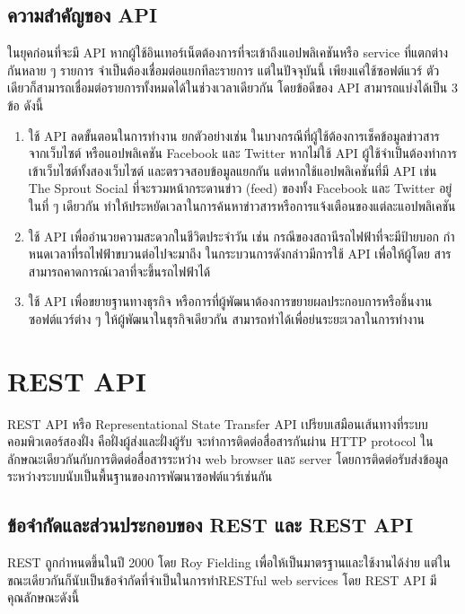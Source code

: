\subsection{ความสําคัญของ API}
    ในยุคก่อนที่จะมี API หากผู้ใช้อินเทอร์เน็ตต้องการที่จะเข้าถึงแอปพลิเคชันหรือ service
ที่แตกต่างกันหลาย ๆ รายการ จําเป็นต้องเชื่อมต่อแยกทีละรายการ แต่ในปัจจุบันนี้ เพียงแค่ใช้\mbox{ซอฟต์แวร์}
ตัวเดียวก็สามารถเชื่อมต่อรายการทั้งหมดได้ในช่วงเวลาเดียวกัน โดยข้อดีของ API สามารถแบ่งได้เป็น
3 ข้อ ดังนี้

     \begin{enumerate}
    \item ใช้ API ลดขั้นตอนในการทํางาน ยกตัวอย่างเช่น ในบางกรณีที่ผู้ใช้ต้องการเช็คข้อมูลข่าวสาร
จากเว็บไซต์ หรือแอปพลิเคชัน Facebook และ Twitter หากไม่ใช้ API ผู้ใช้จําเป็นต้องทําการ
เข้าเว็บไซต์ทั้งสองเว็บไซต์ และตรวจสอบข้อมูลแยกกัน แต่หากใช้แอปพลิเคชันที่มี API เช่น The Sprout Social ที่จะรวมหน้ากระดานข่าว (feed) ของทั้ง Facebook และ Twitter อยู่ในที่ ๆ เดียวกัน ทําให้ประหยัดเวลาในการค้นหาข่าวสารหรือการแจ้งเตือนของแต่ละ\mbox{แอปพลิเคชัน}
    \item ใช้ API เพื่ออํานวยความสะดวกในชีวิตประจําวัน เช่น กรณีของสถานีรถไฟฟ้าที่จะมีป้ายบอก
กําหนดเวลาที่รถไฟฟ้าขบวนต่อไปจะมาถึง ในกระบวนการดังกล่าวมีการใช้ API เพื่อให้ผู้โดย สารสามารถคาดการณ์เวลาที่จะขึ้นรถไฟฟ้าได้
    \item ใช้ API เพื่อขยายฐานทางธุรกิจ หรือการที่ผู้พัฒนาต้องการขยายผลประกอบการหรือชิ้นงาน
ซอฟต์แวร์ต่าง ๆ ให้ผู้พัฒนาในธุรกิจเดียวกัน สามารถทําได้เพื่อย่นระยะเวลาในการทํางาน
\end{enumerate}


\section{REST API}
    REST API หรือ Representational State Transfer API \cite{Rest} เปรียบเสมือนเส้นทางที่ระบบ
คอมพิวเตอร์สองฝั่ง คือฝั่งผู้ส่งและฝั่งผู้รับ จะทําการติดต่อสื่อสารกันผ่าน HTTP protocol ใน
ลักษณะเดียวกันกับการติดต่อสื่อสารระหว่าง web browser และ server โดยการติดต่อรับส่งข้อมูลระหว่างระบบนับเป็นพื้นฐานของการพัฒนาซอฟต์แวร์เช่นกัน
\subsection{ข้อจํากัดและส่วนประกอบของ REST และ REST API}
    REST ถูกกําหนดขึ้นในปี 2000 โดย Roy Fielding เพื่อให้เป็นมาตรฐานและใช้งานได้ง่าย แต่ในขณะเดียวกันก็นับเป็นข้อจํากัดที่จําเป็นในการทําRESTful web services โดย REST API มีคุณลักษณะดังนี้

